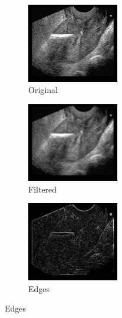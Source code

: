 \documentclass[a4paper,10pt,twocolumn]{article}
\begin{document}
\begin{center}
	\begin{figure}[!htb]
		\begin{subfigure}[a!]{4cm}
			\includegraphics[width=4cm]{image/im5/im_5}
			\caption{Original}
		\end{subfigure}
		\begin{subfigure}[b!]{4cm}
			\includegraphics[width=4cm]{image/im5/im_5_noise}
			\caption{Filtered}
		\end{subfigure}
		\begin{subfigure}[c!]{4cm}
			\includegraphics[width=4cm]{image/im5/im_5_edge}
			\caption{Edges}
		\end{subfigure}
		

\end{figure}
\end{center}
\end{document}

